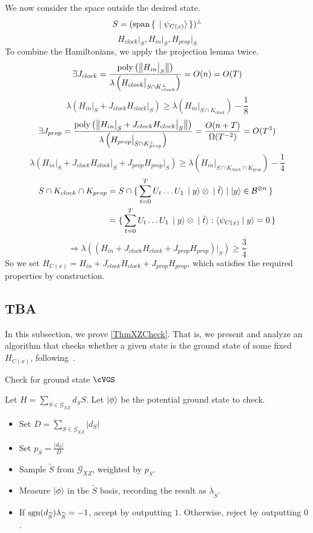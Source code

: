 We now consider the space outside the desired state.
$$S=(\operatorname*{\operatorname{span}}\set{\ket{\psi_{C(x)}}})^\bot$$
$$H_{clock}\big|_S,H_{in}\big|_S,H_{prop}\big|_S$$
To combine the Hamiltonians, we apply the projection lemma twice.
$$\exists J_{clock}
=\frac{\operatorname*{\operatorname{poly}}\left(\left\lVert H_{in}\big|_S\right\rVert\right)}{\lambda\left(H_{clock}\big|_{S\cap K^\bot_{clock}}\right)}
=O(n)=O(T)$$
$$\lambda(H_{in}\big|_S+J_{clock}H_{clock}\big|_S)\geq
\lambda(H_{in}\big|_{S\cap K_{clock}})-\frac{1}{8}$$
$$\exists J_{prop}=\frac{\operatorname*{\operatorname{poly}}\left(\left\lVert H_{in}\big|_S+J_{clock}H_{clock}\big|_S\right\rVert\right)}{\lambda\left(H_{prop}\big|_{S\cap K^\bot_{prop}}\right)}
=\frac{O(n+T)}{\Omega(T^{-2})}=O(T^3)$$
$$\lambda(H_{in}\big|_S+J_{clock}H_{clock}\big|_S+J_{prop}H_{prop}\big|_S)\geq
\lambda(H_{in}\big|_{S\cap K_{clock}\cap K_{prop}})-\frac{1}{4}$$
\begin{align*}
	S\cap K_{clock}\cap K_{prop}&=S\cap\set{\sum_{t=0}^TU_t\ldots U_1\ket{y}\otimes\ket{\hat{t}}|\ket{y}\in\mathcal{B}^{\otimes n}}\\
	&=\set{\sum_{t=0}^TU_t\ldots U_1\ket{y}\otimes\ket{\hat{t}}:\braket{\psi_{C(x)}|y}=0}
\end{align*}
$$\Rightarrow\lambda((H_{in}+J_{clock}H_{clock}+J_{prop}H_{prop})\big|_S)\geq\frac{3}{4}$$
So we set $H_{C(x)}=H_{in}+J_{clock}H_{clock}+J_{prop}H_{prop}$, which satisfies the required properties by construction.

\subsection{TBA}

In this subsection, we prove \cref{ThmXZCheck}.
That is, we present and analyze an algorithm that checks whether a given state is the ground state of some fixed $H_{C(x)}$, following~\cite{PhysRevA.93.022326}.

\begin{algorithm}
	\caption{Check for ground state $\cVGS$}
	\label{AlgGroundStateCheck}
		Let $H=\sum_{S\in\mathcal{G}_{XZ}} d_S S$.
		Let $\ket\phi$ be the potential ground state to check.
		\begin{itemize}
			\item Set $D = \sum_{S\in\mathcal{G}_{XZ}}|d_S|$
			\item Set $p_S = \frac{|d_S|}{D}$
			\item Sample $\widetilde{S}$ from $\mathcal{G}_{XZ}$, weighted by $p_S$.
			\item Measure $\ket\phi$ in the $\widetilde{S}$ basis, recording the result as $\lambda_{\widetilde{S}}$.
			\item If $\operatorname{sgn}(d_{\widetilde{S}})\lambda_{\widetilde{S}}=-1$, accept by outputting $1$. Otherwise, reject by outputting $0$.
		\end{itemize}
\end{algorithm}

